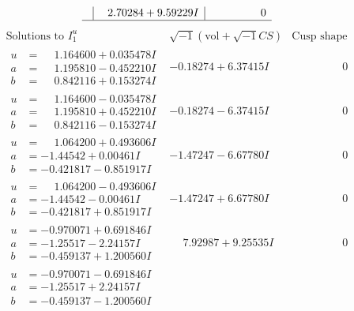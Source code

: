 \documentclass[1p]{elsarticle_modified}
\theoremstyle{definition}
\newcommand{\I}{\sqrt{-1}}
\begin{document}
$$\begin{array}{c|c|c}
 & \phantom{-}2.70284 + 9.59229 I & \phantom{-0.000000 } 0\\
 \hline 
 \end{array}$$\newpage$$\begin{array}{c|c|c}  
\text{Solutions to }I^u_{1}& \I (\text{vol} + \sqrt{-1}CS) & \text{Cusp shape}\\
 \hline 
\begin{aligned}
u &= \phantom{-}1.164600 + 0.035478 I \\
a &= \phantom{-}1.195810 - 0.452210 I \\
b &= \phantom{-}0.842116 + 0.153274 I\end{aligned}
 & -0.18274 + 6.37415 I & \phantom{-0.000000 } 0 \\ \hline\begin{aligned}
u &= \phantom{-}1.164600 - 0.035478 I \\
a &= \phantom{-}1.195810 + 0.452210 I \\
b &= \phantom{-}0.842116 - 0.153274 I\end{aligned}
 & -0.18274 - 6.37415 I & \phantom{-0.000000 } 0 \\ \hline\begin{aligned}
u &= \phantom{-}1.064200 + 0.493606 I \\
a &= -1.44542 + 0.00461 I \\
b &= -0.421817 - 0.851917 I\end{aligned}
 & -1.47247 - 6.67780 I & \phantom{-0.000000 } 0 \\ \hline\begin{aligned}
u &= \phantom{-}1.064200 - 0.493606 I \\
a &= -1.44542 - 0.00461 I \\
b &= -0.421817 + 0.851917 I\end{aligned}
 & -1.47247 + 6.67780 I & \phantom{-0.000000 } 0 \\ \hline\begin{aligned}
u &= -0.970071 + 0.691846 I \\
a &= -1.25517 - 2.24157 I \\
b &= -0.459137 + 1.200560 I\end{aligned}
 & \phantom{-}7.92987 + 9.25535 I & \phantom{-0.000000 } 0 \\ \hline\begin{aligned}
u &= -0.970071 - 0.691846 I \\
a &= -1.25517 + 2.24157 I \\
b &= -0.459137 - 1.200560 I\end{aligned}

\end{array}$$
\end{document}
